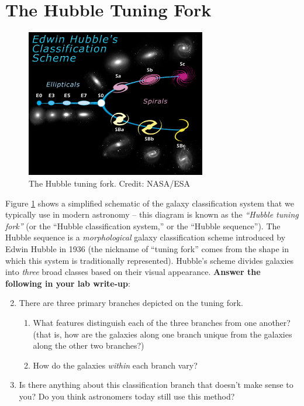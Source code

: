 \documentclass[11pt]{article}
\begin{document}
\section{The Hubble Tuning Fork}

\begin{figure} [h!]
    \centering
    \includegraphics[width=0.7\textwidth]{Images/image.png}
    \caption{The Hubble tuning fork. Credit: NASA/ESA}
    \label{fig:Hubble}
\end{figure}

\noindent
Figure \ref{fig:Hubble} shows a simplified schematic of the galaxy classification system that we typically use in modern astronomy -- this diagram is known as the \textit{``Hubble tuning fork''} (or the ``Hubble classification system,'' or the ``Hubble sequence''). The Hubble sequence is a \emph{morphological} galaxy classification scheme introduced by Edwin Hubble in 1936 (the nickname of ``tuning fork'' comes from the shape in which this system is traditionally represented). Hubble's scheme divides galaxies into \emph{three} broad classes based on their visual appearance. \textbf{Answer the following in your lab write-up}:
\medskip
\begin{enumerate}
\setcounter{enumi}{1}
    \item There are three primary branches depicted on the tuning fork. 
    \begin{enumerate}
        \item What features distinguish each of the three branches from one another? (that is, how are the galaxies along one branch unique from the galaxies along the other two branches?)
        
        \item How do the galaxies \emph{within} each branch vary?
    \end{enumerate}
    
    \item Is there anything about this classification branch that doesn't make sense to you? Do you think astronomers today still use this method?
    
\end{enumerate}
\medskip
\end{document}
